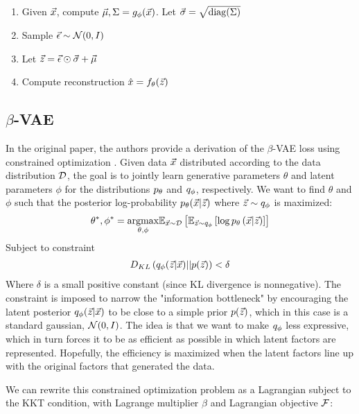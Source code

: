\begin{enumerate}
    \item Given $\vec{x}$, compute $\vec{\mu}, \Sigma = g_\phi(\vec{x})$. Let $\vec{\sigma} = \sqrt{\operatorname{diag}(\Sigma)}$
    \item Sample $\vec{\epsilon}\sim\mathcal{N}(0, I)$
    \item Let $\vec{z} = \vec{\epsilon}\odot\vec{\sigma} + \vec{\mu}$
    \item Compute reconstruction $\hat{x} = f_\theta(\vec{z})$
\end{enumerate}


\subsection{$\beta$-VAE}

In the original paper, the authors provide a derivation of the $\beta$-VAE loss using constrained optimization \cite{higgins2016beta}. Given data $\vec{x}$ distributed according to the data distribution $\mathcal{D}$, the goal is to jointly learn generative parameters $\theta$ and latent parameters $\phi$ for the distributions $p_\theta$ and $q_\phi$, respectively. We want to find $\theta$ and $\phi$ such that the posterior log-probability $p_\theta(\vec{x}|\vec{z})$ where $\vec{z}\sim q_\phi$ is maximized:
\begin{align*}
    \theta^*,\phi^* = \underset{\theta,\phi}{\operatorname{argmax}}\mathbb{E}_{\vec{x}\sim\mathcal{D}}\left[ \mathbb{E}_{\vec{z}\sim q_\phi}\left[ \log p_\theta\left( \vec{x}|\vec{z} \right) \right] \right]
\end{align*}
Subject to constraint
\begin{align*}
    D_{KL}\left( q_\phi(\vec{z}|\vec{x})||p(\vec{z}) \right) < \delta
\end{align*}
Where $\delta$ is a small positive constant (since KL divergence is nonnegative). The constraint is imposed to narrow the "information bottleneck" by encouraging the latent posterior $q_\phi(\vec{z}|\vec{x})$ to be close to a simple prior $p(\vec{z})$, which in this case is a standard gaussian, $\mathcal{N}(0, I)$. The idea is that we want to make $q_\phi$ less expressive, which in turn forces it to be as efficient as possible in which latent factors are represented. Hopefully, the efficiency is maximized when the latent factors line up with the original factors that generated the data.

We can rewrite this constrained optimization problem as a Lagrangian subject to the KKT condition, with Lagrange multiplier $\beta$ and Lagrangian objective $\mathcal{F}$:

